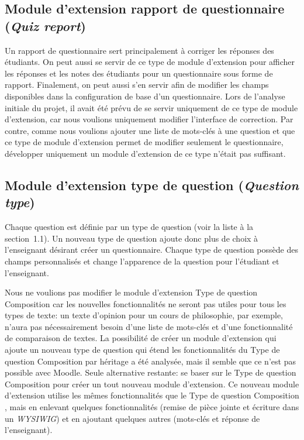 \subsection{Module d'extension rapport de questionnaire (\textit{Quiz report})}
Un rapport de questionnaire sert principalement \`a corriger les r\'eponses des \'etudiants.
On peut aussi se servir de ce type de module d'extension pour afficher les r\'eponses et les notes des \'etudiants pour un questionnaire sous forme de rapport.
Finalement, on peut aussi s'en servir afin de modifier les champs disponibles dans la configuration de base d'un questionnaire.
Lors de l'analyse initiale du projet, il avait \'et\'e pr\'evu de se servir uniquement de ce type de module d'extension, car nous voulions uniquement modifier l'interface de correction.
Par contre, comme nous voulions ajouter une liste de mots-cl\'es \`a une question et que ce type de module d'extension permet de modifier seulement le questionnaire, d\'evelopper uniquement un module d'extension de ce type n'\'etait pas suffisant.

\subsection{Module d'extension type de question (\textit{Question type})}
Chaque question est d\'efinie par un type de question (voir la liste \`a la section~1.1).
Un nouveau type de question ajoute donc plus de choix \`a l'enseignant d\'esirant cr\'eer un questionnaire.
Chaque type de question poss\`ede des champs personnalis\'es et change l'apparence de la question pour l'\'etudiant et l'enseignant.

Nous ne voulions pas modifier le module d'extension \og Type de question Composition \fg{} car les nouvelles fonctionnalit\'es ne seront pas utiles pour tous les types de texte: un texte d'opinion pour un cours de philosophie, par exemple, n'aura pas n\'ecessairement besoin d'une liste de mots-cl\'es et d'une fonctionnalit\'e de comparaison de textes.
La possibilit\'e de cr\'eer un module d'extension qui ajoute un nouveau type de question qui \'etend les fonctionnalit\'es du \og Type de question Composition \fg{} par h\'eritage a \'et\'e analys\'ee, mais il semble que ce n'est pas possible avec Moodle.
Seule alternative restante: se baser sur le \og Type de question Composition \fg{} pour cr\'eer un tout nouveau module d'extension.
Ce nouveau module d'extension utilise les m\^emes fonctionnalit\'es que le \og Type de question Composition \fg{}, mais en enlevant quelques fonctionnalit\'es (remise de pi\`ece jointe et \'ecriture dans un \textit{WYSIWIG}) et en ajoutant quelques autres (mots-cl\'es et r\'eponse de l'enseignant).

